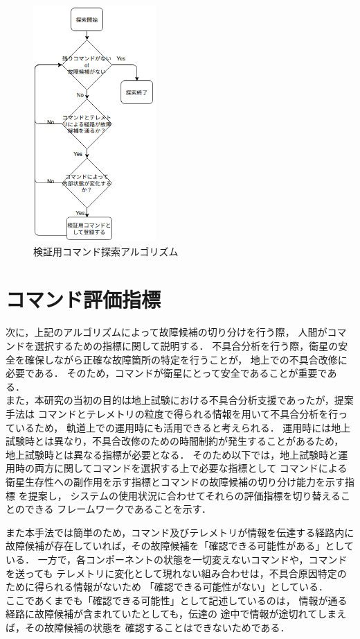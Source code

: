 \documentclass[11pt]{jsreport}
\begin{document}
\begin{figure}[H]
   \centering
      \includegraphics[height=9.0cm]{figure/veri_COM_search.png}
      \caption{検証用コマンド探索アルゴリズム}
      \label{fig:veri_COM_algorithm}
\end{figure}

\newpage
\section{コマンド評価指標}
次に，上記のアルゴリズムによって故障候補の切り分けを行う際，
人間がコマンドを選択するための指標に関して説明する．
不具合分析を行う際，衛星の安全を確保しながら正確な故障箇所の特定を行うことが，
地上での不具合改修に必要である．
そのため，コマンドが衛星にとって安全であることが重要である．\\
また，本研究の当初の目的は地上試験における不具合分析支援であったが，提案手法は
コマンドとテレメトリの粒度で得られる情報を用いて不具合分析を行っているため，
軌道上での運用時にも活用できると考えられる．
運用時には地上試験時とは異なり，不具合改修のための時間制約が発生することがあるため，
地上試験時とは異なる指標が必要となる．
そのため以下では，地上試験時と運用時の両方に関してコマンドを選択する上で必要な指標として
コマンドによる衛星生存性への副作用を示す指標とコマンドの故障候補の切り分け能力を示す指標
を提案し，
システムの使用状況に合わせてそれらの評価指標を切り替えることのできる
フレームワークであることを示す．

また本手法では簡単のため，コマンド及びテレメトリが情報を伝達する経路内に
故障候補が存在していれば，その故障候補を「確認できる可能性がある」としている．
一方で，各コンポーネントの状態を一切変えないコマンドや，コマンドを送っても
テレメトリに変化として現れない組み合わせは，不具合原因特定のために得られる情報がないため
「確認できる可能性がない」としている．\\
ここであくまでも「確認できる可能性」として記述しているのは，
情報が通る経路に故障候補が含まれていたとしても，伝達の
途中で情報が途切れてしまえば，その故障候補の状態を
確認することはできないためである．
\end{document}

